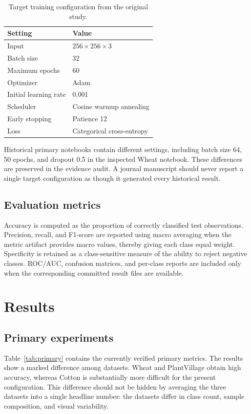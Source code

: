 \documentclass[a4paper,fleqn]{cas-dc}
\begin{document}
\begin{table}[t]
\centering
\caption{Target training configuration from the original study.}
\label{tab:training}
\small
\begin{tabular}{@{}ll@{}}
\toprule
Setting & Value \\
\midrule
Input & $256\times256\times3$ \\
Batch size & 32 \\
Maximum epochs & 60 \\
Optimizer & Adam \\
Initial learning rate & 0.001 \\
Scheduler & Cosine warmup annealing \\
Early stopping & Patience 12 \\
Loss & Categorical cross-entropy \\
\bottomrule
\end{tabular}
\end{table}

Historical primary notebooks contain different settings, including batch size 64, 50 epochs, and dropout 0.5 in the inspected Wheat notebook. These differences are preserved in the evidence audit. A journal manuscript should never report a single target configuration as though it generated every historical result.

\subsection{Evaluation metrics}
Accuracy is computed as the proportion of correctly classified test observations. Precision, recall, and F1-score are reported using macro averaging when the metric artifact provides macro values, thereby giving each class equal weight. Specificity is retained as a class-sensitive measure of the ability to reject negative classes. ROC/AUC, confusion matrices, and per-class reports are included only when the corresponding committed result files are available.

\section{Results}
\subsection{Primary experiments}
Table~\ref{tab:primary} contains the currently verified primary metrics. The results show a marked difference among datasets. Wheat and PlantVillage obtain high accuracy, whereas Cotton is substantially more difficult for the present configuration. This difference should not be hidden by averaging the three datasets into a single headline number: the datasets differ in class count, sample composition, and visual variability.
\end{document}
